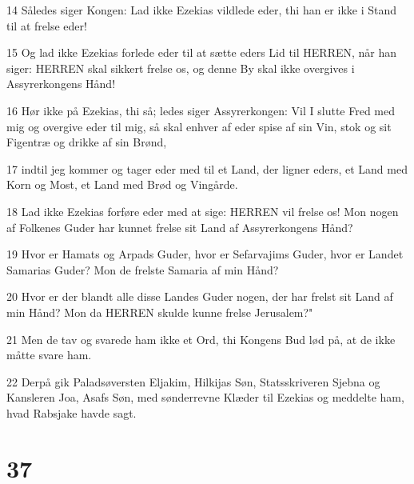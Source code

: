 \par 14 Således siger Kongen: Lad ikke Ezekias vildlede eder, thi han er ikke i Stand til at frelse eder!
\par 15 Og lad ikke Ezekias forlede eder til at sætte eders Lid til HERREN, når han siger: HERREN skal sikkert frelse os, og denne By skal ikke overgives i Assyrerkongens Hånd!
\par 16 Hør ikke på Ezekias, thi så; ledes siger Assyrerkongen: Vil I slutte Fred med mig og overgive eder til mig, så skal enhver af eder spise af sin Vin, stok og sit Figentræ og drikke af sin Brønd,
\par 17 indtil jeg kommer og tager eder med til et Land, der ligner eders, et Land med Korn og Most, et Land med Brød og Vingårde.
\par 18 Lad ikke Ezekias forføre eder med at sige: HERREN vil frelse os! Mon nogen af Folkenes Guder har kunnet frelse sit Land af Assyrerkongens Hånd?
\par 19 Hvor er Hamats og Arpads Guder, hvor er Sefarvajims Guder, hvor er Landet Samarias Guder? Mon de frelste Samaria af min Hånd?
\par 20 Hvor er der blandt alle disse Landes Guder nogen, der har frelst sit Land af min Hånd? Mon da HERREN skulde kunne frelse Jerusalem?"
\par 21 Men de tav og svarede ham ikke et Ord, thi Kongens Bud lød på, at de ikke måtte svare ham.
\par 22 Derpå gik Paladsøversten Eljakim, Hilkijas Søn, Statsskriveren Sjebna og Kansleren Joa, Asafs Søn, med sønderrevne Klæder til Ezekias og meddelte ham, hvad Rabsjake havde sagt.

\chapter{37}

